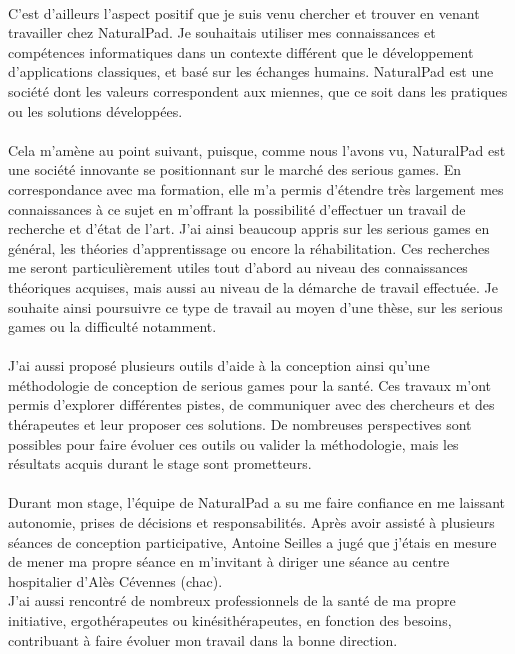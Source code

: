 \paragraph{} C'est d'ailleurs l'aspect positif que je suis venu chercher et trouver en venant travailler chez NaturalPad. Je souhaitais utiliser mes connaissances et compétences informatiques dans un contexte différent que le développement d'applications classiques, et basé sur les échanges humains. NaturalPad est une société dont les valeurs correspondent aux miennes, que ce soit dans les pratiques ou les solutions développées.

\paragraph{} Cela m'amène au point suivant, puisque, comme nous l'avons vu, NaturalPad est une société innovante se positionnant sur le marché des serious games. En correspondance avec ma formation, elle m'a permis d'étendre très largement mes connaissances à ce sujet en m'offrant la possibilité d'effectuer un travail de recherche et d'état de l'art. J'ai ainsi beaucoup appris sur les serious games en général, les théories d'apprentissage ou encore la réhabilitation. Ces recherches me seront particulièrement utiles tout d'abord au niveau des connaissances théoriques acquises, mais aussi au niveau de la démarche de travail effectuée. Je souhaite ainsi poursuivre ce type de travail au moyen d'une thèse, sur les serious games ou la difficulté notamment. 

\paragraph{} J'ai aussi proposé plusieurs outils d'aide à la conception ainsi qu'une méthodologie de conception  de serious games pour la santé. Ces travaux m'ont permis d'explorer différentes pistes, de communiquer avec des chercheurs et des thérapeutes et 
leur proposer ces solutions. De nombreuses perspectives sont possibles pour faire évoluer ces outils ou valider la méthodologie, mais les résultats acquis durant le stage sont prometteurs.

\paragraph{} Durant mon stage, l'équipe de NaturalPad a su me faire confiance en me laissant autonomie, prises de décisions et responsabilités. Après avoir assisté à plusieurs séances de conception participative, Antoine Seilles a jugé que j'étais en mesure de mener ma propre séance en m'invitant à diriger une séance au centre hospitalier d'Alès Cévennes (\gls{chac}). \\
J'ai aussi rencontré de nombreux professionnels de la santé de ma propre initiative, ergothérapeutes ou kinésithérapeutes, en fonction des besoins, contribuant à faire évoluer mon travail dans la bonne direction.

